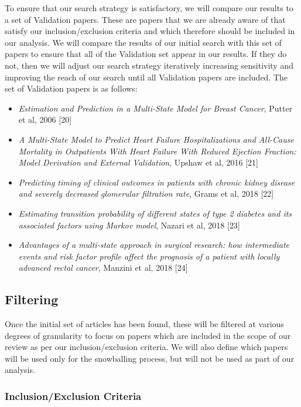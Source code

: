 \documentclass[12pt,PhD,twoside,openright]{muthesis}
\providecommand{\tightlist}{%
  \setlength{\itemsep}{0pt}\setlength{\parskip}{0pt}}
\begin{document}
To ensure that our search strategy is satisfactory, we will compare our results to a set of Validation papers. These are papers that we are already aware of that satisfy our inclusion/exclusion criteria and which therefore should be included in our analysis. We will compare the results of our initial search with this set of papers to ensure that all of the Validation set appear in our results. If they do not, then we will adjust our search strategy iteratively increasing sensitivity and improving the reach of our search until all Validation papers are included. The set of Validation papers is as follows:
\begin{itemize}
\tightlist
\item
  \emph{Estimation and Prediction in a Multi-State Model for Breast Cancer}, Putter et al, 2006 {[}20{]}
\item
  \emph{A Multi-State Model to Predict Heart Failure Hospitalizations and All-Cause Mortality in Outpatients With Heart Failure With Reduced Ejection Fraction: Model Derivation and External Validation}, Upshaw et al, 2016 {[}21{]}
\item
  \emph{Predicting timing of clinical outcomes in patients with chronic kidney disease and severely decreased glomerular filtration rate}, Grams et al, 2018 {[}22{]}
\item
  \emph{Estimating transition probability of different states of type 2 diabetes and its associated factors using Markov model}, Nazari et al, 2018 {[}23{]}
\item
  \emph{Advantages of a multi-state approach in surgical research: how intermediate events and risk factor profile affect the prognosis of a patient with locally advanced rectal cancer}, Manzini et al, 2018 {[}24{]}
\end{itemize}
\hypertarget{filtering}{%
\subsection{Filtering}\label{filtering}}

Once the initial set of articles has been found, these will be filtered at various degrees of granularity to focus on papers which are included in the scope of our review as per our inclusion/exclusion criteria. We will also define which papers will be used only for the snowballing process, but will not be used as part of our analysis.

\hypertarget{inclusionexclusion-criteria}{%
\subsubsection{Inclusion/Exclusion Criteria}\label{inclusionexclusion-criteria}}
\end{document}
